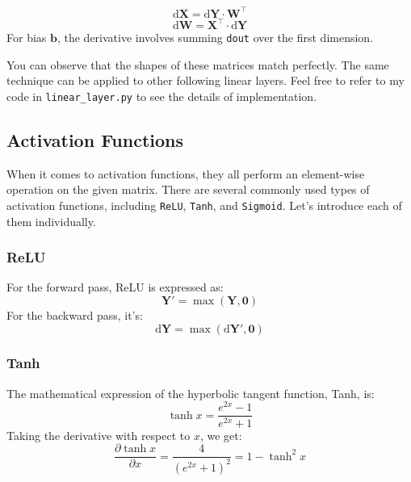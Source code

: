 \documentclass[10pt,a4paper,twoside]{tau}
\renewcommand{\vec}[1]{\mathbf{#1}}
\renewcommand{\d}{\text{d}}
\begin{document}
\begin{equation}
    \d\vec{X} = \d\vec{Y} \cdot \vec{W}^{\top} \tag{3.1.2}
\end{equation}
\begin{equation}
    \d\vec{W} = \vec{X}^{\top} \cdot \d\vec{Y} \tag{3.1.3}
\end{equation}
For bias $\vec{b}$, the derivative involves summing \texttt{dout} over the first dimension. 

You can observe that the shapes of these matrices match perfectly. The same technique can be applied to other following linear layers. Feel free to refer to my code in \texttt{linear\_layer.py} to see the details of implementation.


\subsection{Activation Functions}

When it comes to activation functions, they all perform an element-wise operation on the given matrix. There are several commonly used types of activation functions, including \texttt{ReLU}, \texttt{Tanh}, and \texttt{Sigmoid}. Let's introduce each of them individually.

\subsubsection{ReLU}

For the forward pass, ReLU is expressed as:
\begin{equation}
\vec{Y'} = \max(\vec{Y}, \vec{0}) \tag{3.2.1}
\end{equation}
For the backward pass, it's:
\begin{equation}
\d\vec{Y} = \max(\d\vec{Y'}, \vec{0}) \tag{3.2.2}
\end{equation}

\subsubsection{Tanh}

The mathematical expression of the hyperbolic tangent function, Tanh, is:
\begin{equation}
\tanh{x} = \frac{e^{2x} - 1}{e^{2x} + 1} \tag{3.2.3}
\end{equation}
Taking the derivative with respect to $x$, we get:
\begin{equation}
\frac{\partial \tanh{x}}{\partial x} = \frac{4}{(e^{2x}+1)^2} = 1 - \tanh^2{x} \tag{3.2.4}
\end{equation}
\end{document}
